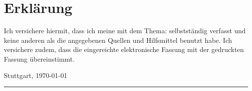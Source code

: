 
\thispagestyle{empty}

\section*{Erklärung}
\vspace*{2em}

Ich versichere hiermit, dass ich meine {\art} mit dem Thema: {\itshape \titel } selbstständig verfasst und keine anderen als die angegebenen Quellen und Hilfsmittel benutzt habe. Ich versichere zudem, dass die eingereichte elektronische Fassung mit der gedruckten Fassung übereinstimmt. 

\vspace{3em}

Stuttgart, \today
\vspace{4em}

\rule{6cm}{0.4pt}\\
\autor